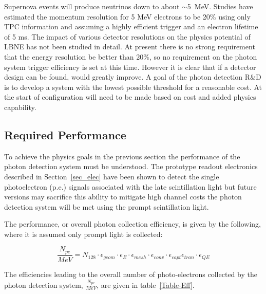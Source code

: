 Supernova events will produce neutrinos down to about
$\sim$5~MeV. Studies have estimated the momentum resolution for 5 MeV
electrons to be 20\% using only TPC information and assuming a highly
efficient trigger and an electron lifetime of 5 ms. The impact of
various detector resolutions on the physics potential of LBNE has not
been studied in detail. At present there is no strong requirement that
the energy resolution %
be better than 20\%, so no requirement on
the photon system trigger efficiency is set at this time. However it
is clear that if a detector design can be found, %
would greatly improve. A goal of the photon detection R\&D is to
develop a system with the lowest possible threshold for a reasonable
cost. At the %
start of %
configuration will need to be made based on cost and added physics
capability.

\subsection{Required Performance}

To achieve the physics goals in the previous section the performance
of the photon detection system must be understood. The prototype
readout electronics described in Section~\ref{sec_elec} have been
shown to detect the single photoelectron (p.e.) signals associated with the late
scintillation light but future versions may sacrifice this ability to
mitigate high channel costs %
the photon detection system will be met using the prompt
scintillation light.

The performance, or overall photon collection efficiency, is given by
the following, where it is assumed only prompt light is collected:

\begin{equation}\label{eff_eqn}
\frac{N_{pe}}{MeV} = N_{128}\cdot \epsilon_{geom} \cdot \epsilon_{E} \cdot
\epsilon_{mesh} \cdot \epsilon_{conv} \cdot \epsilon_{capt}
\epsilon_{tran} \cdot \epsilon_{QE} 
\end{equation}

The efficiencies leading to the overall number of photo-electrons
collected by the photon detection system, $\frac{N_{pe}}{MeV}$, are given
in table~\ref{Table-Eff}.


